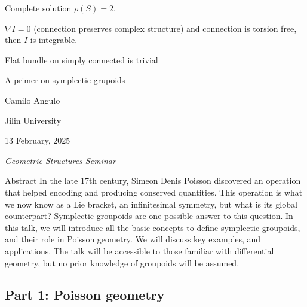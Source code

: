 \begin{thm}\leavevmode
Complete solution \(\rho(S)=2\).
\end{thm}







\begin{thm}\leavevmode
\(\nabla I = 0\) (connection preserves complex structure) and connection is torsion free, then \(I \) is integrable.
\end{thm}

\begin{exercise}\leavevmode

Flat bundle on simply connected is trivial
\end{exercise}


\clearpage{}
{\Huge A primer on symplectic grupoids}

\hfill{\Large Camilo Angulo}

{\Large \hfill Jilin University}

\hfill{\large 13 February, 2025 

\hfill \textit{Geometric Structures Seminar}}
\vspace{2em}

\begin{thing4}{Abstract}
In the late 17th century, Simeon Denis Poisson discovered an operation that helped encoding and producing conserved quantities. This operation is what we now know as a Lie bracket, an infinitesimal symmetry, but what is its global counterpart? Symplectic groupoids are one possible answer to this question. In this talk, we will introduce all the basic concepts to define symplectic groupoids, and their role in Poisson geometry. We will discuss key examples, and applications. The talk will be accessible to those familiar with differential geometry, but no prior knowledge of groupoids will be assumed.  
\end{thing4}
\vspace{.5em}

\subsection{Part 1: Poisson geometry}


